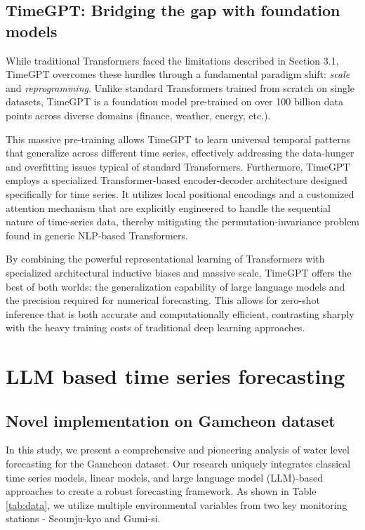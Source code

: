\documentclass[a4paper,twoside,flushend, 10pt]{article}
\begin{document}
\subsection{TimeGPT: Bridging the gap with foundation models}

While traditional Transformers faced the limitations described in Section 3.1, TimeGPT \cite{GM2023} overcomes these hurdles through a fundamental paradigm shift: \textit{scale} and \textit{reprogramming}. Unlike standard Transformers trained from scratch on single datasets, TimeGPT is a foundation model pre-trained on over 100 billion data points across diverse domains (finance, weather, energy, etc.).

This massive pre-training allows TimeGPT to learn universal temporal patterns that generalize across different time series, effectively addressing the data-hunger and overfitting issues typical of standard Transformers. Furthermore, TimeGPT employs a specialized Transformer-based encoder-decoder architecture designed specifically for time series. It utilizes local positional encodings and a customized attention mechanism that are explicitly engineered to handle the sequential nature of time-series data, thereby mitigating the permutation-invariance problem found in generic NLP-based Transformers.

By combining the powerful representational learning of Transformers with specialized architectural inductive biases and massive scale, TimeGPT offers the best of both worlds: the generalization capability of large language models and the precision required for numerical forecasting. This allows for zero-shot inference that is both accurate and computationally efficient, contrasting sharply with the heavy training costs of traditional deep learning approaches.


\section{LLM based time series forecasting}
\subsection{Novel implementation on Gamcheon dataset}

In this study, we present a comprehensive and pioneering analysis of water level forecasting for the Gamcheon dataset. Our research uniquely integrates classical time series models, linear models, and large language model (LLM)-based approaches to create a robust forecasting framework. As shown in Table \ref{tab:data}, we utilize multiple environmental variables from two key monitoring stations - Seounju-kyo and Gumi-si. 
\end{document}
